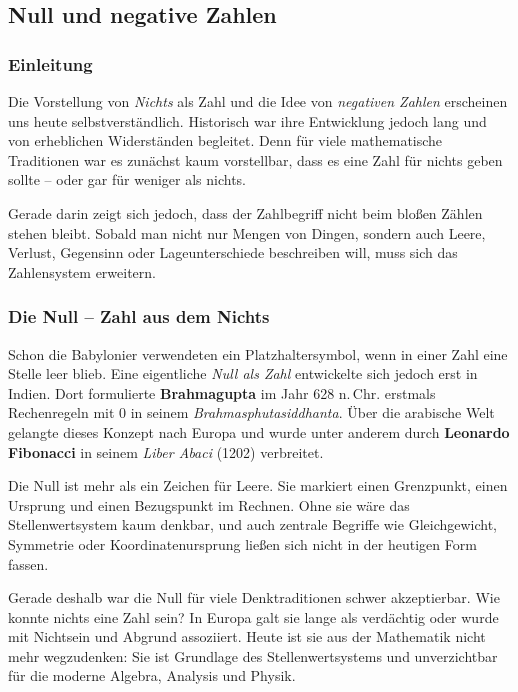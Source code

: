 \subsection{Null und negative Zahlen}
\label{sec:2.3_null_negative}

\subsubsection*{Einleitung}
 Die Vorstellung von \emph{Nichts} als Zahl 
und die Idee von \emph{negativen Zahlen}
erscheinen uns heute selbstverständlich.
Historisch war ihre Entwicklung jedoch lang
und von erheblichen Widerständen begleitet.
Denn für viele mathematische Traditionen war es zunächst kaum vorstellbar,
dass es eine Zahl für \glqq nichts\grqq{} geben sollte --
oder gar für \glqq weniger als nichts\grqq.

Gerade darin zeigt sich jedoch,
dass der Zahlbegriff nicht beim bloßen Zählen stehen bleibt.
Sobald man nicht nur Mengen von Dingen,
sondern auch Leere, Verlust, Gegensinn oder Lageunterschiede beschreiben will,
muss sich das Zahlensystem erweitern.

\subsubsection*{Die Null -- Zahl aus dem Nichts}
Schon die Babylonier verwendeten ein Platzhaltersymbol,
wenn in einer Zahl eine Stelle leer blieb.
Eine eigentliche \emph{Null als Zahl} entwickelte sich jedoch erst in Indien.
Dort formulierte \textbf{Brahmagupta}
im Jahr 628 n.\,Chr. erstmals Rechenregeln mit $0$
in seinem \emph{Brahmasphutasiddhanta}.
Über die arabische Welt gelangte dieses Konzept nach Europa
und wurde unter anderem durch
\textbf{Leonardo Fibonacci}
in seinem \emph{Liber Abaci} (1202) verbreitet.

Die Null ist mehr als ein Zeichen für Leere.
Sie markiert einen Grenzpunkt,
einen Ursprung und einen Bezugspunkt im Rechnen.
Ohne sie wäre das Stellenwertsystem kaum denkbar,
und auch zentrale Begriffe wie Gleichgewicht, Symmetrie oder Koordinatenursprung
ließen sich nicht in der heutigen Form fassen.

Gerade deshalb war die Null für viele Denktraditionen schwer akzeptierbar.
Wie konnte \glqq nichts\grqq{} eine Zahl sein?
In Europa galt sie lange als verdächtig
oder wurde mit Nichtsein und Abgrund assoziiert.
Heute ist sie aus der Mathematik nicht mehr wegzudenken:
Sie ist Grundlage des Stellenwertsystems
und unverzichtbar für die moderne Algebra, Analysis und Physik.

